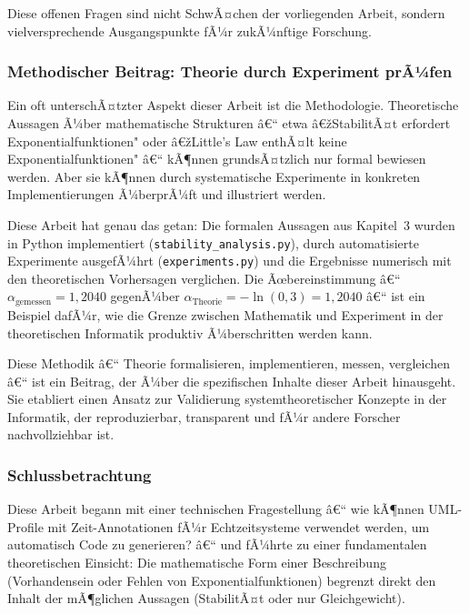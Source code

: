 ﻿\documentclass[a4paper,12pt]{scrreprt}
\theoremstyle{definition}
\begin{document}
Diese offenen Fragen sind nicht SchwÃ¤chen der vorliegenden Arbeit, sondern
vielversprechende Ausgangspunkte fÃ¼r zukÃ¼nftige Forschung.

\subsubsection{Methodischer Beitrag: Theorie durch Experiment prÃ¼fen}

Ein oft unterschÃ¤tzter Aspekt dieser Arbeit ist die Methodologie.
Theoretische Aussagen Ã¼ber mathematische Strukturen â€“ etwa â€žStabilitÃ¤t
erfordert Exponentialfunktionen" oder â€žLittle's Law enthÃ¤lt keine
Exponentialfunktionen" â€“ kÃ¶nnen grundsÃ¤tzlich nur formal bewiesen werden.
Aber sie kÃ¶nnen durch systematische Experimente in konkreten
Implementierungen Ã¼berprÃ¼ft und illustriert werden.

Diese Arbeit hat genau das getan: Die formalen Aussagen aus Kapitel~3 wurden
in Python implementiert (\texttt{stability\_analysis.py}), durch automatisierte
Experimente ausgefÃ¼hrt (\texttt{experiments.py}) und die Ergebnisse numerisch
mit den theoretischen Vorhersagen verglichen.  Die Ãœbereinstimmung â€“
$\alpha_\text{gemessen} = 1{,}2040$ gegenÃ¼ber $\alpha_\text{Theorie} =
-\ln(0{,}3) = 1{,}2040$ â€“ ist ein Beispiel dafÃ¼r, wie die Grenze zwischen
Mathematik und Experiment in der theoretischen Informatik produktiv Ã¼berschritten
werden kann.

Diese Methodik â€“ Theorie formalisieren, implementieren, messen, vergleichen â€“
ist ein Beitrag, der Ã¼ber die spezifischen Inhalte dieser Arbeit hinausgeht.
Sie etabliert einen Ansatz zur Validierung systemtheoretischer Konzepte in
der Informatik, der reproduzierbar, transparent und fÃ¼r andere Forscher
nachvollziehbar ist.

\subsubsection{Schlussbetrachtung}

Diese Arbeit begann mit einer technischen Fragestellung â€“ wie kÃ¶nnen
UML-Profile mit Zeit-Annotationen fÃ¼r Echtzeitsysteme verwendet werden,
um automatisch Code zu generieren? â€“ und fÃ¼hrte zu einer fundamentalen
theoretischen Einsicht: Die mathematische Form einer Beschreibung
(Vorhandensein oder Fehlen von Exponentialfunktionen) begrenzt direkt
den Inhalt der mÃ¶glichen Aussagen (StabilitÃ¤t oder nur Gleichgewicht).
\end{document}
